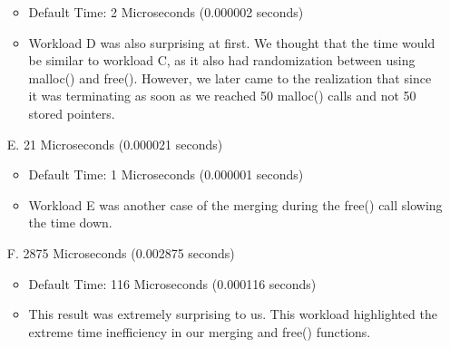 \documentclass{article}
\begin{document}
\begin{enumerate}
\begin{itemize}
                \item
                    Default Time: 2 Microseconds (0.000002 seconds)
                \item
                    Workload D was also surprising at first. We thought that the time would be similar to workload C, as it also had randomization between using malloc() and free(). However, we later came to the realization that since it was terminating as soon as we reached 50 malloc() calls and not 50 stored pointers.
            \end{itemize}
        \item[E.]
            21 Microseconds (0.000021 seconds)
            \begin{itemize}
                \item
                    Default Time: 1 Microseconds (0.000001 seconds)
                \item
                    Workload E was another case of the merging during the free() call slowing the time down.
            \end{itemize}
        \item[F.]
            2875 Microseconds (0.002875 seconds)
            \begin{itemize}
                \item
                    Default Time: 116 Microseconds (0.000116 seconds)
                \item
                    This result was extremely surprising to us. This workload highlighted the extreme time inefficiency in our merging and free() functions.
            \end{itemize}
    \end{enumerate}
\end{document}
